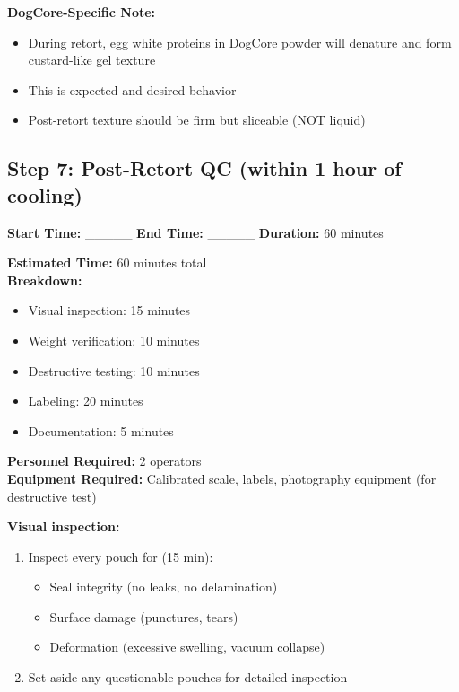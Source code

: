\textbf{DogCore-Specific Note:}
\begin{itemize}
\item During retort, egg white proteins in DogCore powder will denature and form custard-like gel texture
\item This is expected and desired behavior
\item Post-retort texture should be firm but sliceable (NOT liquid)
\end{itemize}


\subsection*{Step 7: Post-Retort QC (within 1 hour of cooling)}

\textbf{Start Time:} \_\_\_\_\_ \hspace{1cm} \textbf{End Time:} \_\_\_\_\_ \hspace{1cm} \textbf{Duration:} 60 minutes

\vspace{0.5em}

\textbf{Estimated Time:} 60 minutes total \\
\textbf{Breakdown:}
\begin{itemize}
\item Visual inspection: 15 minutes
\item Weight verification: 10 minutes
\item Destructive testing: 10 minutes
\item Labeling: 20 minutes
\item Documentation: 5 minutes
\end{itemize}
\textbf{Personnel Required:} 2 operators \\
\textbf{Equipment Required:} Calibrated scale, labels, photography equipment (for destructive test)

\vspace{0.5em}
\textbf{Visual inspection:}
\begin{enumerate}[leftmargin=1.5em]
\item Inspect every pouch for (15 min):
  \begin{itemize}
  \item Seal integrity (no leaks, no delamination)
  \item Surface damage (punctures, tears)
  \item Deformation (excessive swelling, vacuum collapse)
  \end{itemize}
\item Set aside any questionable pouches for detailed inspection
\end{enumerate}

